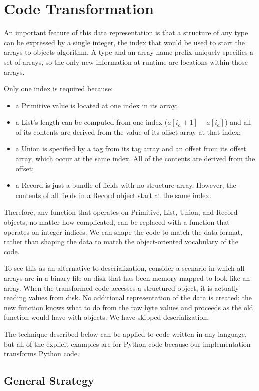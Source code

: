 \documentclass[10pt, conference, compsocconf]{IEEEtran}
\begin{document}
\section{Code Transformation}

An important feature of this data representation is that a structure of any type can be expressed by a single integer, the index that would be used to start the arrays-to-objects algorithm. A type and an array name prefix uniquely specifies a set of arrays, so the only new information at runtime are locations within those arrays.

Only one index is required because:
\begin{itemize}
\item a Primitive value is located at one index in its array;
\item a List's length can be computed from one index \mbox{($a[i_a + 1] - a[i_a]$)} and all of its contents are derived from the value of its offset array at that index;
\item a Union is specified by a tag from its tag array and an offset from its offset array, which occur at the same index. All of the contents are derived from the offset;
\item a Record is just a bundle of fields with no structure array. However, the contents of all fields in a Record object start at the same index.
\end{itemize}

Therefore, any function that operates on Primitive, List, Union, and Record objects, no matter how complicated, can be replaced with a function that operates on integer indices. We can shape the code to match the data format, rather than shaping the data to match the object-oriented vocabulary of the code.

To see this as an alternative to deserialization, consider a scenario in which all arrays are in a binary file on disk that has been memory-mapped to look like an array. When the transformed code accesses a structured object, it is actually reading values from disk. No additional representation of the data is created; the new function knows what to do from the raw byte values and proceeds as the old function would have with objects. We have skipped deserialization.

The technique described below can be applied to code written in any language, but all of the explicit examples are for Python code because our implementation\cite{plur} transforms Python code.

\subsection{General Strategy}
\end{document}
